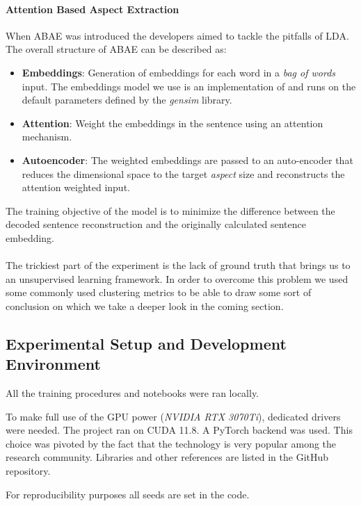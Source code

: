 \paragraph{Attention Based Aspect Extraction}
When ABAE was introduced the developers aimed to tackle the pitfalls of LDA.
The overall structure of ABAE can be described as:
\begin{itemize}
    \item {\textbf{Embeddings}}: Generation of embeddings for each word in a \textit{bag of words} input.
    The embeddings model we use is an implementation of  and runs on the default parameters defined by the \textit{gensim} library.
    \item {\textbf{Attention}}: Weight the embeddings in the sentence using an attention mechanism.
    \item {\textbf{Autoencoder}}: The weighted embeddings are passed to an auto-encoder that reduces the dimensional
    space to the target \textit{aspect} size and reconstructs the attention weighted input.
\end{itemize}

The training objective of the model is to minimize the difference between the decoded sentence reconstruction
and the originally calculated sentence embedding.

\paragraph{}
The trickiest part of the experiment is the lack of ground truth that brings us to an unsupervised learning framework.
In order to overcome this problem we used some commonly used clustering metrics to be able to draw some sort of conclusion on which we
take a deeper look in the coming section.

\subsection{Experimental Setup and Development Environment}
All the training procedures and notebooks were ran locally.

To make full use of the GPU power (\textit{NVIDIA RTX 3070Ti}), dedicated drivers were needed.
The project ran on CUDA 11.8.
A PyTorch backend was used.
This choice was pivoted by the fact that the technology is very popular among the research community.
Libraries and other references are listed in the GitHub repository\cite{Fichera_Muffin_vs_Chihuahua_2024}.

For reproducibility purposes all seeds are set in the code.


